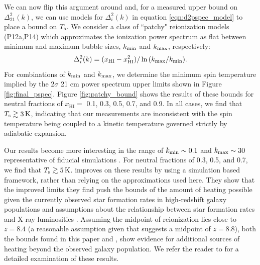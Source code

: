 \documentclass[twocolumn,numberedappendix]{emulateapj} \shorttitle{PSA64}
\newcommand{\Tspin}{T_{\rm s}}
\newcommand{\kmin}{k_{\rm min}}
\newcommand{\kmax}{k_{\rm max}}
\begin{document}
We can now flip this argument around and, for a measured upper bound on $\Delta^2_{21}(k)$, we
can use models for $\Delta_i^2(k)$ in equation \ref{eqn:d2pspec_model} to place a bound
on $\Tspin$.  
%
We consider a class of ``patchy" reionization models (P12a,P14) which
approximates the ionization power spectrum as flat between minimum and maximum
bubble sizes, $\kmin$ and $\kmax$, respectively:
\begin{equation}\label{eqn:patchy_bound}
    \Delta^{2}_{i}(k) = (x_{\text{HI}} -
x_{\text{HI}}^{2})/\ln{(\kmax/\kmin)}.
\end{equation}
For combinations of $\kmin$ and $\kmax$,
we 
determine the minimum spin temperature 
implied by the $2\sigma$ 21 cm power
spectrum upper limits shown in Figure \ref{fig:final_pspec}.
Figure \ref{fig:patchy_bound} shows the results of these bounds
for neutral fractions of $x_{\text{HI}}=$ 0.1, 0.3, 0.5, 0.7, and 0.9.
In all cases, we find that $\Tspin\gtrsim 3\,\text{K}$, indicating 
that our measurements are inconsistent with the spin temperature
being coupled to a kinetic temperature governed strictly by
adiabatic expansion.

Our results become more interesting in the range of $\kmin\sim0.1$ and
$\kmax\sim30$ representative of fiducial simulations
\citep{lidz_et_al2008,zahn_et_al2007}.  For neutral fractions of 0.3, 0.5, and
0.7, we find that $\Tspin\gtrsim 5\,\text{K}$. \citet{pober_et_al2015} improves
on these results by using a simulation based framework, rather than relying on
the approximations used here. They show that the improved limits they find push
the bounds of the amount of heating possible given the currently observed star
formation rates in high-redshift galaxy populations
\citep{bouwens_et_al2014,mcleod_et_al2014} and assumptions about the
relationship between star formation rates and X-ray luminosities
\citep{furlanetto_et_al2006,pritchard_loeb2008,fialkov_et_al2014}.  Assuming the
midpoint of reionization lies close to $z=8.4$ (a reasonable assumption given
that \citealt{planck_2015} suggests a midpoint of $z=8.8$), both the bounds
found in this paper and \cite{pober_et_al2015}, show evidence for additional
sources of heating beyond the observed galaxy population.  We refer the reader
to \citet{pober_et_al2015} for a detailed examination of these results.
\end{document}
